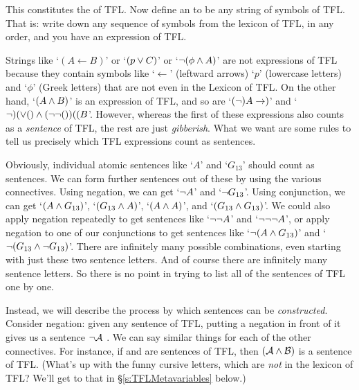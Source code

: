This constitutes the  of TFL.  Now define an  to be any string of symbols of TFL.  That is: write down any sequence of symbols from the lexicon of TFL, in any order, and you have an expression of TFL.   

Strings like `$(A \leftarrow B)$' or `$(p \vee C)$' or `$\neg (\phi \wedge A)$' are not expressions of TFL because they contain symbols like `$\leftarrow$' (leftward arrows) `$p$' (lowercase letters) and `$\phi$' (Greek letters) that are not even in the Lexicon of TFL.  On the other hand, `$(A \wedge B)$' is an expression of TFL, and so are `$(\neg)A\rightarrow)$' and `$\lnot)(\vee()\wedge(\neg\neg())((B$'. However, whereas the first of these expressions also counts as a \emph{sentence} of TFL, the rest are just \emph{gibberish}. What we want are some rules to tell us precisely which TFL expressions count as sentences.  


Obviously, individual atomic sentences like `$A$' and `$G_{13}$' should count as sentences. We can form further sentences out of these by using the various connectives. Using negation, we can get `$\neg A$' and `$\neg G_{13}$'. Using conjunction, we can get `$(A \wedge G_{13})$', `$(G_{13} \wedge A)$', `$(A \wedge A)$', and `$(G_{13} \wedge G_{13})$'. We could also apply negation repeatedly to get sentences like `$\neg \neg A$' and `$\neg \neg \neg A$', or apply negation to one of our conjunctions to get sentences like `$\neg(A \wedge G_{13})$' and `$\neg(G_{13} \wedge \neg G_{13})$'. There are infinitely many possible combinations, even starting with just these two sentence letters.  And of course there are infinitely many sentence letters. So there is no point in trying to list all of the sentences of TFL one by one.

Instead, we will describe the process by which sentences can be \emph{constructed}. Consider negation: given any sentence  of TFL, putting a negation in front of it gives us a sentence $\neg\mathcal{A}$ .  
We can say similar things for each of the other connectives. For instance, if  and  are sentences of TFL, then $(\mathcal{A}\wedge\mathcal{B})$ is a sentence of TFL.  (What's up with the funny cursive letters, which are \emph{not} in the lexicon of TFL?  We'll get to that in \S\ref{s:TFLMetavariables} below.)


